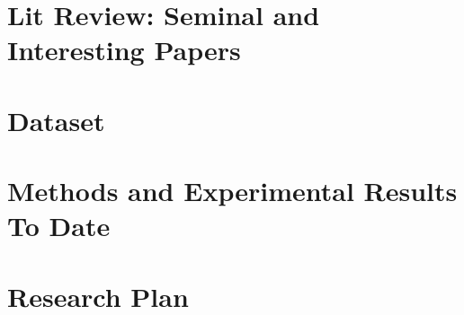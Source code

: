 \documentclass[11pt]{report}
\begin{document}
\begin{spacing}{1.2}




\chapter{Lit Review:  Seminal and Interesting Papers}






\chapter{Dataset}




\chapter{Methods and Experimental Results To Date}








\chapter{Research Plan}






\newpage
{}
{}
\printbibliography



\end{spacing}
\end{document}
